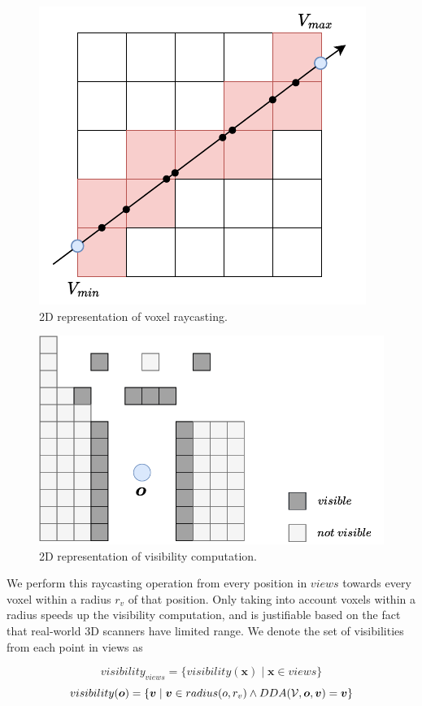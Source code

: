 \begin{figure}[h]
    \centering
    \includegraphics*[width=.5\textwidth]{./fig/dda.pdf}
    \caption{2D representation of voxel raycasting.}
    \label{fig:voxel_raycast}

\end{figure}

\begin{figure}[h]
    \centering
    \includegraphics*[width=.7\textwidth]{./fig/visibility.pdf}
    \caption{2D representation of visibility computation.}
    \label{fig:visibility}

\end{figure}

We perform this raycasting operation from every position in \(views\) towards every voxel within a radius \(r_{v}\) of that position. Only taking into account voxels within a radius speeds up the visibility computation, and is justifiable based on the fact that real-world 3D scanners have limited range. We denote the set of visibilities from each point in views as 

\begin{equation}
    \label{eq:visibility_views}
visibility_{views} = \{visibility(\boldsymbol{x}) \mid \boldsymbol{x} \in views\}
\end{equation}
\begin{equation}
    visibility(\boldsymbol{o}) = \{\boldsymbol{v} \mid \boldsymbol{v} \in radius(o, r_{v}) \land DDA(\mathcal{V},\boldsymbol{o},\boldsymbol{v}) = \boldsymbol{v}\}
\end{equation}


